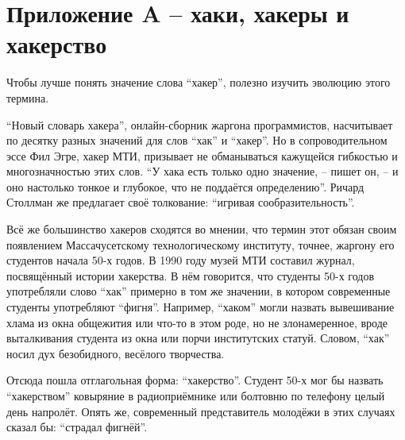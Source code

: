 
\chapter{Приложение A -- хаки, хакеры и хакерство} \label{Appendix A}

Чтобы лучше понять значение слова \enquote{хакер}, полезно изучить эволюцию этого термина.

\enquote{Новый словарь хакера}, онлайн-сборник жаргона программистов, насчитывает по десятку разных значений для слов \enquote{хак} и \enquote{хакер}. Но в сопроводительном эссе Фил Эгре, хакер МТИ, призывает не обманываться кажущейся гибкостью и многозначностью этих слов. \enquote{У хака есть только одно значение, -- пишет он, -- и оно настолько тонкое и глубокое, что не поддаётся определению}. Ричард Столлман же предлагает своё толкование: \enquote{игривая сообразительность}.

Всё же большинство хакеров сходятся во мнении, что термин этот обязан своим появлением Массачусетскому технологическому институту, точнее, жаргону его студентов начала 50-х годов. В 1990 году музей МТИ составил журнал, посвящённый истории хакерства. В нём говорится, что студенты 50-х годов употребляли слово \enquote{хак} примерно в том же значении, в котором современные студенты употребляют \enquote{фигня}. Например, \enquote{хаком} могли назвать вывешивание хлама из окна общежития или что-то в этом роде, но не злонамеренное, вроде выталкивания студента из окна или порчи институтских статуй. Словом, \enquote{хак} носил дух безобидного, весёлого творчества.

Отсюда пошла отглагольная форма: \enquote{хакерство}. Студент 50-х мог бы назвать \enquote{хакерством} ковыряние в радиоприёмнике или болтовню по телефону целый день напролёт. Опять же, современный представитель молодёжи в этих случаях сказал бы: \enquote{страдал фигнёй}.

